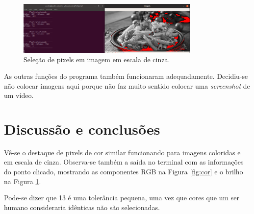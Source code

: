 \documentclass{bmvc2k}
\begin{document}
\begin{figure}[htpb]
\begin{center}
\includegraphics[width=0.8\textwidth]{Figs/img1.png}
\end{center}
   \caption{Seleção de pixels em imagem em escala de cinza.}
   \label{fig:gray}
\end{figure}

As outras funções do programa também funcionaram adequadamente. Decidiu-se não colocar imagens aqui porque não faz muito sentido colocar uma \textit{screenshot} de um vídeo. 

\section{Discussão e conclusões}
\label{sec:concl}

Vê-se o destaque de pixels de cor similar funcionando para imagens coloridas e em escala de cinza. Observa-se também a saída no terminal com as informações do ponto clicado, mostrando as componentes RGB na Figura \ref{fig:cor} e o brilho na Figura \ref{fig:gray}.

Pode-se dizer que 13 é uma tolerância pequena, uma vez que cores que um ser humano consideraria idênticas não são selecionadas.



\end{document}
